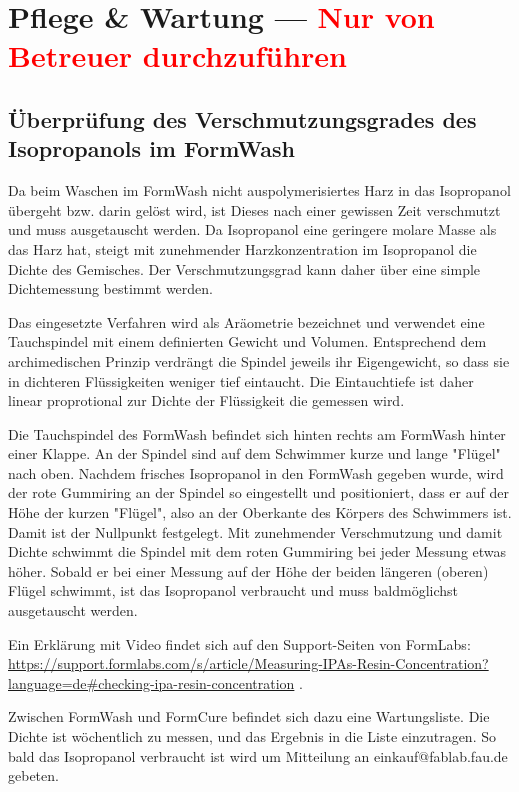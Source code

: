 \documentclass{\basedir/fablab-document}
\begin{document}

\section{Pflege \& Wartung --- \textcolor{red}{Nur von Betreuer durchzuführen}}

\subsection{Überprüfung des Verschmutzungsgrades des Isopropanols im FormWash}
Da beim Waschen im FormWash nicht auspolymerisiertes Harz in das Isopropanol übergeht bzw. darin gelöst wird, ist Dieses nach einer gewissen Zeit verschmutzt und muss ausgetauscht werden. Da Isopropanol eine geringere molare Masse als das Harz hat, steigt mit zunehmender Harzkonzentration im Isopropanol die Dichte des Gemisches. Der Verschmutzungsgrad kann daher über eine simple Dichtemessung bestimmt werden.

Das eingesetzte Verfahren wird als Aräometrie bezeichnet und verwendet eine Tauchspindel mit einem definierten Gewicht und Volumen. Entsprechend dem archimedischen Prinzip verdrängt die Spindel jeweils ihr Eigengewicht, so dass sie in dichteren Flüssigkeiten weniger tief eintaucht. Die Eintauchtiefe ist daher linear proprotional zur Dichte der Flüssigkeit die gemessen wird.

Die Tauchspindel des FormWash befindet sich hinten rechts am FormWash hinter einer Klappe. An der Spindel sind auf dem Schwimmer kurze und lange "Flügel" nach oben. Nachdem frisches Isopropanol in den FormWash gegeben wurde, wird der rote Gummiring an der Spindel so eingestellt und positioniert, dass er auf der Höhe der kurzen "Flügel", also an der Oberkante des Körpers des Schwimmers ist. Damit ist der Nullpunkt festgelegt. Mit zunehmender Verschmutzung und damit Dichte schwimmt die Spindel mit dem roten Gummiring bei jeder Messung etwas höher. Sobald er bei einer Messung auf der Höhe der beiden längeren (oberen) Flügel schwimmt, ist das Isopropanol verbraucht und muss baldmöglichst ausgetauscht werden.

Ein Erklärung mit Video findet sich auf den Support-Seiten von FormLabs: \url{https://support.formlabs.com/s/article/Measuring-IPAs-Resin-Concentration?language=de#checking-ipa-resin-concentration} .

Zwischen FormWash und FormCure befindet sich dazu eine Wartungsliste. Die Dichte ist wöchentlich zu messen, und das Ergebnis in die Liste einzutragen. So bald das Isopropanol verbraucht ist wird um Mitteilung an einkauf@fablab.fau.de gebeten.
\end{document}
